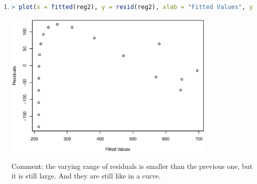 \documentclass{article}
\begin{document}
\begin{enumerate}[leftmargin = 0 em, label = \arabic*., font = \bfseries]
\begin{enumerate}
\item 
\begin{lstlisting}[language = R]
> plot(x = fitted(reg2), y = resid(reg2), xlab = "Fitted Values", ylab = "Residuals")
\end{lstlisting}
\begin{center}
\includegraphics[width = 0.8\textwidth]{reg2resid.eps}
\end{center}
Comment: the varying range of residuals is smaller than the previous one, but it is still large. And they are still like in a curve. 
	\end{enumerate}
 	\end{enumerate}


	
	
	
	
\end{document}
